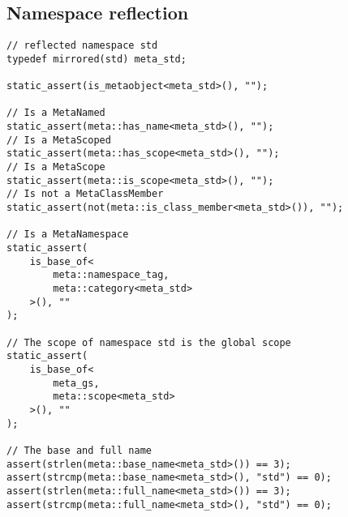 \subsection{Namespace reflection}

\begin{verbatim}
// reflected namespace std
typedef mirrored(std) meta_std;

static_assert(is_metaobject<meta_std>(), "");

// Is a MetaNamed
static_assert(meta::has_name<meta_std>(), "");
// Is a MetaScoped
static_assert(meta::has_scope<meta_std>(), "");
// Is a MetaScope
static_assert(meta::is_scope<meta_std>(), "");
// Is not a MetaClassMember
static_assert(not(meta::is_class_member<meta_std>()), "");

// Is a MetaNamespace
static_assert(
	is_base_of<
		meta::namespace_tag,
		meta::category<meta_std>
	>(), ""
);

// The scope of namespace std is the global scope
static_assert(
	is_base_of<
		meta_gs,
		meta::scope<meta_std>
	>(), ""
);

// The base and full name
assert(strlen(meta::base_name<meta_std>()) == 3);
assert(strcmp(meta::base_name<meta_std>(), "std") == 0);
assert(strlen(meta::full_name<meta_std>()) == 3);
assert(strcmp(meta::full_name<meta_std>(), "std") == 0);
\end{verbatim}
